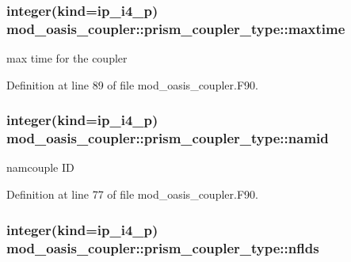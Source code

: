 \hypertarget{structmod__oasis__coupler_1_1prism__coupler__type_abe7dd91c4d011f5717e203191b7788e3}{
\subsubsection[{maxtime}]{\setlength{\rightskip}{0pt plus 5cm}integer(kind=ip\+\_\+i4\+\_\+p) mod\+\_\+oasis\+\_\+coupler\+::prism\+\_\+coupler\+\_\+type\+::maxtime\hspace{0.3cm}{\ttfamily [private]}}}\label{structmod__oasis__coupler_1_1prism__coupler__type_abe7dd91c4d011f5717e203191b7788e3}


max time for the coupler 



Definition at line 89 of file mod\+\_\+oasis\+\_\+coupler.\+F90.

\hypertarget{structmod__oasis__coupler_1_1prism__coupler__type_a68ccbd8305f8c1016a9025558ab8dea5}{
\subsubsection[{namid}]{\setlength{\rightskip}{0pt plus 5cm}integer(kind=ip\+\_\+i4\+\_\+p) mod\+\_\+oasis\+\_\+coupler\+::prism\+\_\+coupler\+\_\+type\+::namid\hspace{0.3cm}{\ttfamily [private]}}}\label{structmod__oasis__coupler_1_1prism__coupler__type_a68ccbd8305f8c1016a9025558ab8dea5}


namcouple I\+D 



Definition at line 77 of file mod\+\_\+oasis\+\_\+coupler.\+F90.

\hypertarget{structmod__oasis__coupler_1_1prism__coupler__type_a08fa25cab6817cfbc0c660a4f51d3857}{
\subsubsection[{nflds}]{\setlength{\rightskip}{0pt plus 5cm}integer(kind=ip\+\_\+i4\+\_\+p) mod\+\_\+oasis\+\_\+coupler\+::prism\+\_\+coupler\+\_\+type\+::nflds\hspace{0.3cm}{\ttfamily [private]}}}\label{structmod__oasis__coupler_1_1prism__coupler__type_a08fa25cab6817cfbc0c660a4f51d3857}


